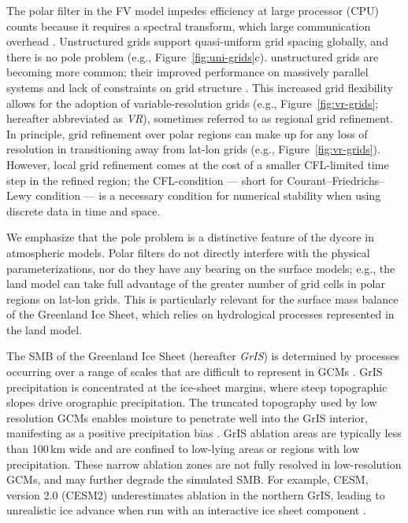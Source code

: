 \documentclass[draft]{agujournal2019}
\begin{document}
The polar filter in the FV model impedes efficiency at large processor (CPU) counts because it requires a spectral transform, which {\color{blue}{has a}} large communication overhead \cite{ST1995GEOS,DetAl2012IJHPCA}. Unstructured grids support quasi-uniform grid spacing globally, and there is no pole problem (e.g., Figure~\ref{fig:uni-grids}c). {\color{blue}{This is in part why}} unstructured grids are becoming more common; their improved performance on massively parallel systems and lack of constraints on grid structure \cite{TTI1997JCP,PL2007JCP,WETAL2013GMD}. This increased grid flexibility allows for the adoption of variable-resolution grids (e.g., Figure~\ref{fig:vr-grids}; hereafter abbreviated as \textit{VR}), sometimes referred to as regional grid refinement. In principle, grid refinement over polar regions can make up for any loss of resolution in transitioning away from lat-lon grids (e.g., Figure~\ref{fig:vr-grids}).  However, local grid refinement comes at the cost of a smaller CFL-limited time step in the refined region; the CFL-condition --- short for Courant–Friedrichs–Lewy condition --- is a necessary condition for numerical stability when using discrete data in time and space.

We emphasize that the pole problem is a distinctive feature of the dycore in atmospheric models. Polar filters do not directly interfere with the physical parameterizations, nor do they have any bearing on the surface models; e.g., the land model can take full advantage of the greater number of grid cells in polar regions on lat-lon grids. This is particularly relevant for the surface mass balance {} of the Greenland Ice Sheet, which relies on hydrological processes represented in the land model.

The SMB of the Greenland Ice Sheet (hereafter \textit{GrIS}) is determined by processes occurring over a range of scales that are difficult to represent in GCMs \cite{P2010CC}. GrIS precipitation is concentrated at the ice-sheet margins, where steep topographic slopes drive orographic precipitation. The truncated topography used by low resolution GCMs enables moisture to penetrate well into the GrIS interior, manifesting as a positive precipitation bias \cite{P2000GPC,VETAL2018TC}. GrIS ablation areas {\color{blue}{(marginal regions where the annual SMB is negative)}} are typically less than 100\,km wide and are confined to low-lying areas or regions with low precipitation. These narrow ablation zones are not fully resolved in low-resolution GCMs, and may further degrade the simulated SMB. For example, CESM, version 2.0 (CESM2) underestimates ablation in the northern GrIS, leading to unrealistic ice advance when run with an interactive ice sheet component \cite{LETAL2020JAMES}.
\end{document}
